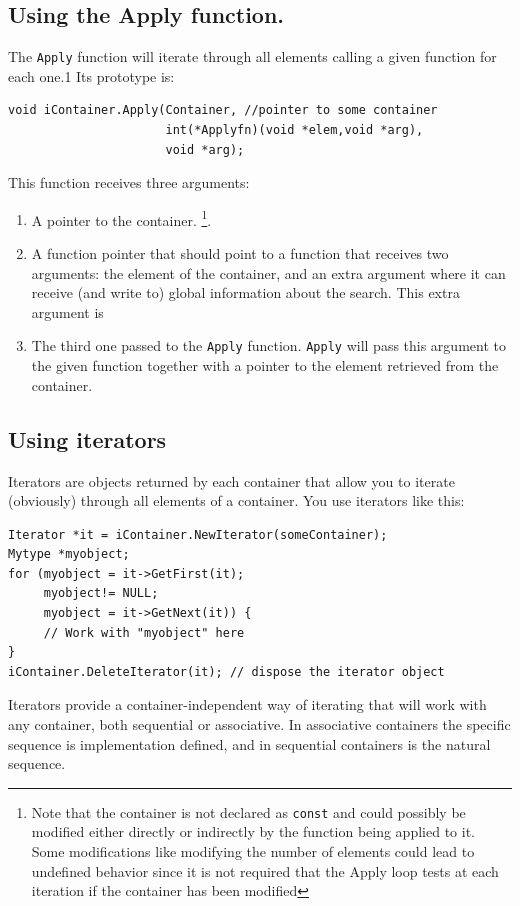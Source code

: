 \documentclass[12pt,a4paper,openany]{memoir} %
\begin{document}
\subsection{Using the Apply function.}
The \verb,Apply, function will iterate through all elements calling a given function for each one.1 Its prototype is:
\begin{verbatim}
void iContainer.Apply(Container, //pointer to some container
                      int(*Applyfn)(void *elem,void *arg),
                      void *arg);
\end{verbatim}
This function receives three arguments:
\begin{enumerate}
\item A pointer to the container. \footnote{Note that the container is not declared as \texttt{const} and could possibly be modified either directly or 
indirectly by the function being applied to it. Some modifications like modifying the number of elements could lead to undefined behavior since it
is not required that the Apply loop tests at each iteration if the container has been modified}.
\item A function pointer that should point to a function that receives two arguments: the element of the container, and an extra argument where it can 
receive (and write to) global information about the search.  This extra argument is 
\item The third one passed to the \verb,Apply, function. \verb,Apply, will pass this argument to the given function together with a pointer to the 
element retrieved from the container.
\end{enumerate}
\subsection{Using iterators}
Iterators are objects returned by each container that allow you to iterate (obviously) through all elements of a container.
You use iterators like this:
\begin{verbatim}
Iterator *it = iContainer.NewIterator(someContainer);
Mytype *myobject;
for (myobject = it->GetFirst(it); 
     myobject!= NULL; 
     myobject = it->GetNext(it)) {
     // Work with "myobject" here
}
iContainer.DeleteIterator(it); // dispose the iterator object
\end{verbatim}
Iterators provide a container-independent way of iterating that will work with any container, both sequential or associative. In associative containers 
the specific sequence is implementation defined, and in sequential containers is the natural sequence.
\end{document}
